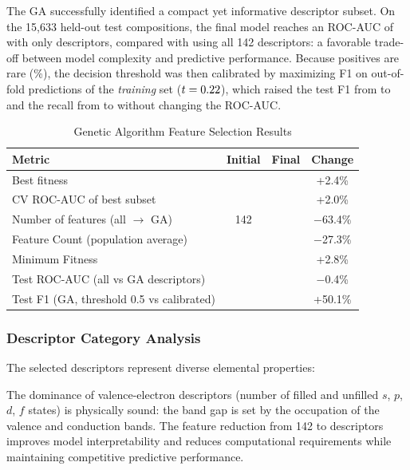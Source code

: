 The GA successfully identified a compact yet informative descriptor subset. On the 15,633
held-out test compositions, the final model reaches an ROC-AUC of \GapGAAUC{} with only
\GAFinalN{} descriptors, compared with \GapAllAUC{} using all 142 descriptors: a favorable
trade-off between model complexity and predictive performance. Because positives are rare
(\GapPos{}\%), the decision threshold was then calibrated by maximizing F1 on out-of-fold
predictions of the \emph{training} set ($t=0.22{}$), which raised the test F1 from
\GapGAFone{} to \GapTunedFone{} and the recall from \GapGARec{} to \GapTunedRec{} without
changing the ROC-AUC.

\begin{table}[H]
\centering\small
\begin{tabular}{lccc}
\toprule
Metric & Initial & Final & Change\\
\midrule
Best fitness & \GAInitFit{} & \GAFinalFit{} & +2.4\%\\
CV ROC-AUC of best subset & \GAInitAUC{} & \GAFinalAUC{} & +2.0\%\\
Number of features (all $\rightarrow$ GA) & 142 & \GAFinalN{} & $-$63.4\%\\
Feature Count (population average) & \GAInitAvgN{} & \GAFinalAvgN{} & $-$27.3\%\\
Minimum Fitness & \GAInitMinFit{} & \GAFinalMinFit{} & +2.8\%\\
\midrule
Test ROC-AUC (all vs GA descriptors) & \GapAllAUC{} & \GapGAAUC{} & $-$0.4\%\\
Test F1 (GA, threshold 0.5 vs calibrated) & \GapGAFone{} & \GapTunedFone{} & +50.1\%\\
\bottomrule
\end{tabular}
\caption*{Genetic Algorithm Feature Selection Results}
\end{table}

\subsubsection{Descriptor Category Analysis}

The selected \GAFinalN{} descriptors represent diverse elemental properties:

The dominance of valence-electron descriptors (number of filled and unfilled $s$, $p$, $d$, $f$
states) is physically sound: the band gap is set by the occupation of the valence and
conduction bands. The feature reduction from 142 to \GAFinalN{} descriptors improves model
interpretability and reduces computational requirements while maintaining competitive
predictive performance.

